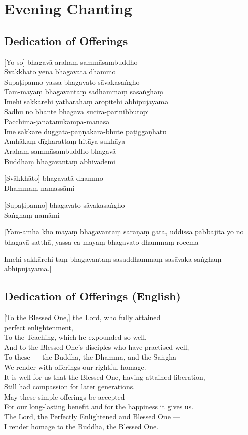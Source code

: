 \chapter{Evening Chanting}

\section*{Dedication of Offerings}


[Yo so] bhagavā arahaṃ sammāsambuddho\\
Svākkhāto yena bhagavatā dhammo\\
Supaṭipanno yassa bhagavato sāvakasaṅgho\\
Tam-mayaṃ bhagavantaṃ sadhammaṃ sasaṅghaṃ\\
Imehi sakkārehi yathārahaṃ āropitehi abhipūjayāma\\
Sādhu no bhante bhagavā sucira-parinibbutopi\\
Pacchimā-janatānukampa-mānasā\\
Ime sakkāre duggata-paṇṇākāra-bhūte paṭiggaṇhātu\\
Amhākaṃ dīgharattaṃ hitāya sukhāya\\
Arahaṃ sammāsambuddho bhagavā\\
Buddhaṃ bhagavantaṃ abhivādemi

[Svākkhāto] bhagavatā dhammo\\
Dhammaṃ namassāmi

[Supaṭipanno] bhagavato sāvakasaṅgho\\
Saṅghaṃ namāmi

[Yam-amha kho mayaṃ bhagavantaṃ saraṇaṃ gatā, uddissa pabbajitā yo no bhagavā
satthā, yassa ca mayaṃ bhagavato dhammaṃ rocema

Imehi sakkārehi taṃ bhagavantaṃ sasaddhammaṃ sasāvaka-saṅghaṃ abhipūjayāma.]

\section*{Dedication of Offerings (English)}

[To the Blessed One,] the Lord, who fully attained\\
\vin perfect enlightenment,\\
To the Teaching, which he expounded so well,\\
And to the Blessed One's disciples who have practised well,\\
To these --- the Buddha, the Dhamma, and the Saṅgha ---\\
We render with offerings our rightful homage.\\
It is well for us that the Blessed One, having attained liberation,\\
Still had compassion for later generations.\\
May these simple offerings be accepted\\
For our long-lasting benefit and for the happiness it gives us.\\
The Lord, the Perfectly Enlightened and Blessed One ---\\
I render homage to the Buddha, the Blessed One. 

